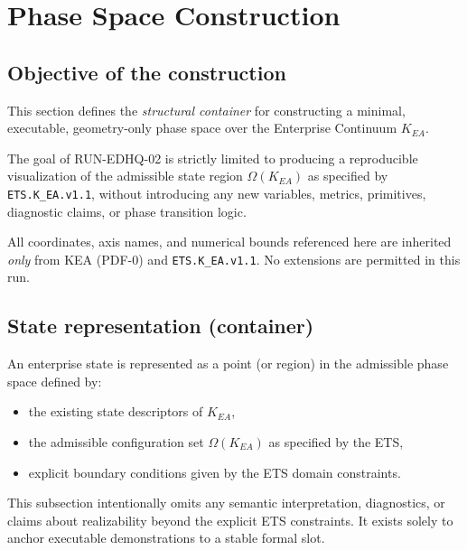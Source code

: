 
\section{Phase Space Construction}
\label{sec:phase-space}

\subsection{Objective of the construction}
This section defines the \emph{structural container} for constructing a minimal,
executable, geometry-only phase space over the Enterprise Continuum \(K_{EA}\).

The goal of RUN-EDHQ-02 is strictly limited to producing a reproducible
visualization of the admissible state region \(\Omega(K_{EA})\) as specified by
\texttt{ETS.K\_EA.v1.1}, without introducing any new variables, metrics, primitives,
diagnostic claims, or phase transition logic.

All coordinates, axis names, and numerical bounds referenced here are inherited
\emph{only} from KEA (PDF-0) and \texttt{ETS.K\_EA.v1.1}. No extensions are permitted
in this run.

\subsection{State representation (container)}
An enterprise state is represented as a point (or region) in the admissible
phase space defined by:
\begin{itemize}
  \item the existing state descriptors of \(K_{EA}\),
  \item the admissible configuration set \(\Omega(K_{EA})\) as specified by the ETS,
  \item explicit boundary conditions given by the ETS domain constraints.
\end{itemize}

This subsection intentionally omits any semantic interpretation, diagnostics,
or claims about realizability beyond the explicit ETS constraints. It exists solely
to anchor executable demonstrations to a stable formal slot.

